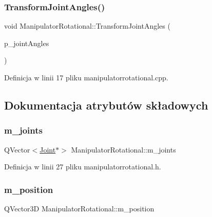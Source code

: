 \subsubsection{\texorpdfstring{Transform\+Joint\+Angles()}{TransformJointAngles()}}
{\footnotesize\ttfamily void Manipulator\+Rotational\+::\+Transform\+Joint\+Angles (\begin{DoxyParamCaption}\item[{Q\+Vector$<$ float $>$}]{p\+\_\+joint\+Angles }\end{DoxyParamCaption})}



Definicja w linii 17 pliku manipulatorrotational.\+cpp.



\subsection{Dokumentacja atrybutów składowych}
\mbox{\label{class_manipulator_rotational_a31303c0a6c8a03f3cd0754aec802a808}} 
\subsubsection{\texorpdfstring{m\+\_\+joints}{m\_joints}}
{\footnotesize\ttfamily Q\+Vector$<$\hyperlink{class_joint}{Joint}$\ast$$>$ Manipulator\+Rotational\+::m\+\_\+joints\hspace{0.3cm}{\ttfamily [protected]}}



Definicja w linii 27 pliku manipulatorrotational.\+h.

\mbox{\label{class_manipulator_rotational_a18221f06199833851af9eebd9a6ca438}} 
\subsubsection{\texorpdfstring{m\+\_\+position}{m\_position}}
{\footnotesize\ttfamily Q\+Vector3D Manipulator\+Rotational\+::m\+\_\+position\hspace{0.3cm}{\ttfamily [protected]}}



